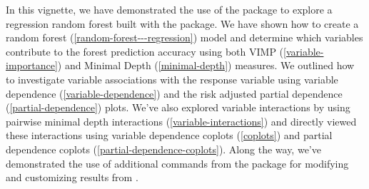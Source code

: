 \documentclass[article]{jss}
\begin{document}
In this vignette, we have demonstrated the use of the
 package to explore a regression random forest
built with the  package. We have shown how to
create a random forest (\autoref{random-forest---regression}) model and
determine which variables contribute to the forest prediction accuracy
using both VIMP (\autoref{variable-importance}) and Minimal Depth
(\autoref{minimal-depth}) measures. We outlined how to investigate
variable associations with the response variable using variable
dependence (\autoref{variable-dependence}) and the risk adjusted partial
dependence (\autoref{partial-dependence}) plots. We've also explored
variable interactions by using pairwise minimal depth interactions
(\autoref{variable-interactions}) and directly viewed these interactions
using variable dependence coplots (\autoref{coplots}) and partial
dependence coplots (\autoref{partial-dependence-coplots}). Along the
way, we've demonstrated the use of additional commands from the
 package for modifying and customizing results from
.

\renewcommand\refname{References}

\end{document}
